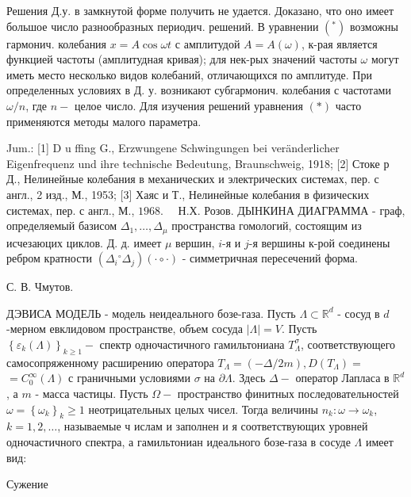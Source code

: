 \documentclass[10pt]{article}
\begin{document}
Решения Д.у. в замкнутой форме получить не удается. Доказано, что оно имеет большое число разнообразных периодич. решений. В уравнении $\left({ }^{*}\right)$ возможны гармонич. колебания $x=A \cos \omega t$ с амплитудой $A=A(\omega)$, к-рая является функцией частоты (амплитудная кривая); для нек-рых значений частоты $\omega$ могут иметь место несколько видов колебаний, отличающихся по амплитуде. При определенных условиях в Д. у. возникают субгармонич. колебания с частотами $\omega / n$, где $n-$ целое число. Для изучения решений уравнения $(*)$ часто применяются методы малого параметра.



Jum.: [1] D u ffing G., Erzwungene Schwingungen bei veränderlicher Eigenfrequenz und ihre technische Bedeutung, Braunschweig, 1918; [2] Стоке р Д., Нелинейные колебания в механических и электрических системах, пер. с англ., 2 изд., М., 1953; [3] Хаяс и Т., Нелинейные колебания в физических системах, пер. с англ., М., $1968 . \quad$ Н.Х. Розов. ДЫНКИНА ДИАГРАММА - граф, определяемый базисом $\Delta_{1}, \ldots, \Delta_{\mu}$ пространства гомологий, состоящим из исчезаюцих циклов. Д. д. имеет $\mu$ вершин, $i$-я и $j$-я вершины к-рой соединены ребром кратности $\left(\Delta_{i}{ }^{\circ} \Delta_{j}\right)(\cdot \circ \cdot)$ - симметричная пересечений форма.



С. В. Чмутов.



ДЭВИСА МОДЕЛЬ - модель неидеального бозе-газа. Пусть $\Lambda \subset \mathbb{R}^{d}$ - сосуд в $d$-мерном евклидовом пространстве, объем сосуда $|\Lambda|=V$. Пусть $\left\{\varepsilon_{k}(\Lambda)\right\}_{k \geqslant 1}-$ спектр одночастичного гамильтониана $T_{\Lambda}^{\sigma}$, соответствующего самосопряженному расширению оператора $T_{\Lambda}=(-\Delta / 2 m), D\left(T_{\Lambda}\right)=$ $=C_{0}^{\infty}(\Lambda)$ с граничными условиями $\sigma$ на $\partial \Lambda$. Здесь $\Delta-$ оператор Лапласа в $\mathbb{R}^{d}$, а $m$ - масса частицы. Пусть $\Omega-$ пространство финитных последовательностей $\omega=\left\{\omega_{k}\right\}_{k} \geqslant 1$ неотрицательных целых чисел. Тогда величины $n_{k}: \omega \rightarrow \omega_{k}$, $k=1,2, \ldots$, называемые ч ислам и заполнен и я соответствующих уровней одночастичного спектра, а гамильтониан идеального бозе-газа в сосуде $\Lambda$ имеет вид:



Сужение
\end{document}
